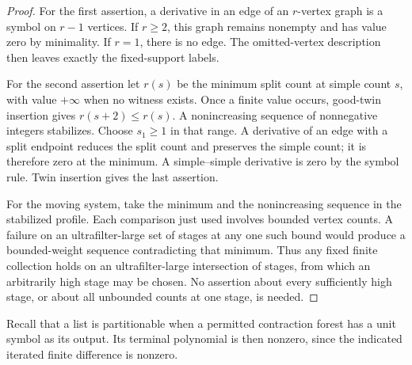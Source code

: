 \begin{proof}
For the first assertion, a derivative in an edge of an $r$-vertex graph is a
symbol on $r-1$ vertices.  If $r\ge2$, this graph remains nonempty and has
value zero by minimality.  If $r=1$, there is no edge.  The omitted-vertex
description then leaves exactly the fixed-support labels.

For the second assertion let $r(s)$ be the minimum split count at simple
count $s$, with value $+\infty$ when no witness exists.  Once a finite value
occurs, good-twin insertion gives $r(s+2)\le r(s)$.  A nonincreasing sequence
of nonnegative integers stabilizes.  Choose $s_1\ge1$ in that range.  A
derivative of an edge with a split endpoint reduces the split count and
preserves the simple count; it is therefore zero at the minimum.  A
simple--simple derivative is zero by the symbol rule.  Twin insertion gives
the last assertion.

For the moving system, take the minimum and the nonincreasing sequence in
the stabilized profile.  Each comparison just used involves bounded vertex
counts.  A failure on an ultrafilter-large set of stages at any one such bound
would produce a bounded-weight sequence contradicting that minimum.  Thus
any fixed finite collection holds on an ultrafilter-large intersection of
stages, from which an arbitrarily high stage may be chosen.  No assertion
about every sufficiently high stage, or about all unbounded counts at one
stage, is needed.
\end{proof}

Recall that a list is partitionable when a permitted contraction forest
has a unit symbol as its output.  Its terminal polynomial is then nonzero,
since the indicated iterated finite difference is nonzero.

